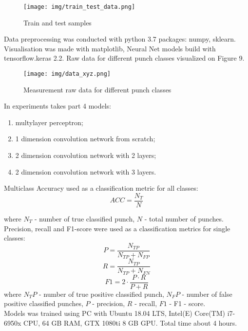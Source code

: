 \documentclass[sport,article,submit,moreauthors,pdftex]{Definitions/mdpi}
\begin{document}
\begin{figure}[H]
\texttt{[image: img/train\_test\_data.png]}
\caption{Train and test samples}
\end{figure}

 Data preprocessing was conducted with python 3.7 packages: numpy, sklearn. Visualisation was made with matplotlib, Neural Net models build with tensorflow.keras 2.2. Raw data for different punch classes visualized on Figure 9.

\begin{figure}[H]
\texttt{[image: img/data\_xyz.png]}
\caption{Measurement raw data for different punch classes}
\end{figure}

In experiments takes part 4 models:
\begin{enumerate}
\item	multylayer perceptron;
\item	1 dimension convolution network from scratch;
\item	2 dimension convolution network with 2 layers;
\item	2 dimension convolution network with 3 layers.
\end{enumerate}

Multiclass Accuracy used as a classification metric for all classes:
\begin{equation}
ACC = \frac{N_T}{N}
\end{equation}

where $N_T$ - number of true classified punch,
$N$ - total number of punches.\\
Precision, recall and F1-score were used as a classification metrics for single classes:
\begin{equation}
P = \frac{N_{TP}}{N_{TP} + N_{FP}}
\end{equation}
\begin{equation}
R = \frac{N_{TP}}{N_{TP} + N_{FN}}
\end{equation}
\begin{equation}
F1 = 2 \cdot \frac{P \cdot R}{P + R}
\end{equation}
where $N_TP$ - number of true positive classified punch,
$N_FP$ - number of false positive classified punches, $P$ - precision, $R$ - recall, $F1$ - F1 - score.\\
Models was trained using PC with Ubuntu 18.04 LTS, Intel(E) Core(TM) i7-6950x CPU, 64 GB RAM, GTX 1080ti 8 GB GPU. Total time about 4 hours.

\end{document}

